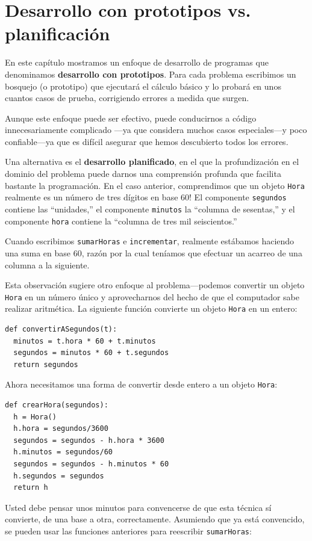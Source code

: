 \section{Desarrollo con prototipos vs. planificación}
\label{convert}

En este capítulo mostramos un enfoque de desarrollo de 
programas que denominamos  {\bf desarrollo con prototipos}. 
Para cada problema escribimos un bosquejo  (o prototipo) que
ejecutará el cálculo básico y lo probará en unos cuantos
casos de prueba, corrigiendo errores a medida que surgen.

Aunque este enfoque puede ser efectivo, puede conducirnos
a código innecesariamente complicado ---ya que considera
muchos casos especiales---y poco confiable---ya que es
difícil asegurar que hemos descubierto todos los errores.

Una alternativa es el {\bf desarrollo planificado}, en 
el que la profundización en el dominio del problema puede
darnos una comprensión profunda que facilita bastante la 
programación. En el caso anterior, comprendimos que 
un objeto  \texttt{Hora} realmente es un número de
tres dígitos en base 60!  El componente \texttt{segundos} 
contiene las  ``unidades,'' el componente
\texttt{minutos} la  ``columna de sesentas,'' y 
el componente \texttt{hora} contiene la ``columna de tres mil 
seiscientos.''

Cuando escribimos  \texttt{sumarHoras} e \texttt{incrementar}, 
realmente estábamos haciendo una suma en base 60, razón 
por la cual teníamos que efectuar un acarreo de una columna
a la siguiente.

Esta observación sugiere otro enfoque al problema---podemos
convertir un objeto  \texttt{Hora} en un número único 
y aprovecharnos del hecho de que el computador sabe
realizar aritmética.  La siguiente función convierte
un objeto  \texttt{Hora} en un entero:

\beforeverb
\begin{verbatim}
def convertirASegundos(t):
  minutos = t.hora * 60 + t.minutos
  segundos = minutos * 60 + t.segundos
  return segundos
\end{verbatim}
\afterverb
%
Ahora necesitamos una forma de convertir desde entero
a un objeto  \texttt{Hora}:


\beforeverb
\begin{verbatim}
def crearHora(segundos):
  h = Hora()
  h.hora = segundos/3600
  segundos = segundos - h.hora * 3600
  h.minutos = segundos/60
  segundos = segundos - h.minutos * 60
  h.segundos = segundos
  return h
\end{verbatim}
\afterverb
%
Usted debe pensar unos minutos para convencerse de que
esta técnica sí convierte, de una base a otra, correctamente.
Asumiendo que ya está convencido, se pueden usar las 
funciones anteriores para reescribir {\tt sumarHoras}:

